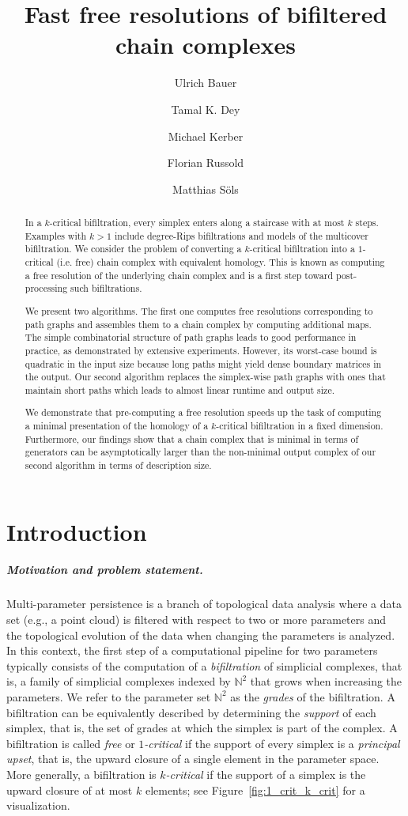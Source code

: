 \documentclass[a4paper,UKenglish,cleveref,nolineno,autoref]{socg-lipics-v2021}
\title{Fast free resolutions of bifiltered chain complexes}
\author{Ulrich Bauer}{Department of Mathematics and MDSI and MCML, Technical University of Munich, Germany}{mail@ulrich-bauer.org}{orcid.org/0000-0002-9683-0724}{}
\author{Tamal K. Dey}{Department of Computer Science, Purdue University, USA}{tamaldey@purdue.edu}{https://orcid.org/0000-0001-5160-9738}{NSF grants
DMS-2301360 and CCF-2437030}
\author{Michael Kerber}{Institute of Geometry, Graz University of Technology, Austria}{kerber@tugraz.at}{https://orcid.org/0000-0002-8030-9299}{Austrian Science Fund (FWF) grant 10.55776/P33765}
\author{Florian Russold}{Institute of Geometry, Graz University of Technology, Austria}{russold@tugraz.at}{https://orcid.org/0009-0003-2978-0477}{Austrian Science Fund (FWF) grants 10.55776/P33765 and 10.55776/W1230}
\author{Matthias S\"ols}{Department of Mathematics, Technical University of Munich, Germany and Institute of Geometry, Graz University of Technology, Austria}{matthias.soels@tum.de}{Add orcid number}{Austrian Science Fund (FWF) grants 10.55776/P33765 and 10.55776/W1230}
\newcommand{\define}[1]{\emph{#1}} %
\begin{document}
\maketitle

\begin{abstract}
In a $k$-critical bifiltration, every simplex enters along a staircase with at most $k$ steps. Examples with $k>1$ include degree-Rips bifiltrations and models of the multicover bifiltration. We consider the problem of converting a $k$-critical bifiltration into a $1$-critical (i.e. free) chain complex with equivalent homology. This is known as computing a free resolution of the underlying chain complex and is a first step toward post-processing such bifiltrations.

We present two algorithms. The first one computes free resolutions corresponding to path graphs and assembles them to a chain complex by computing additional maps. The simple combinatorial structure of path graphs leads to good performance in practice, as demonstrated by extensive experiments. However, its worst-case bound is quadratic in the input size because long paths might yield dense boundary matrices in the output. Our second algorithm replaces the simplex-wise path graphs with ones that maintain short paths which leads to almost linear runtime and output size.

We demonstrate that pre-computing a free resolution speeds up the task of computing a minimal presentation of the homology of a $k$-critical bifiltration in a fixed dimension. Furthermore, our findings show that a chain complex that is minimal in terms of generators can be asymptotically larger than the non-minimal output complex of our second algorithm in terms of description size.
\end{abstract}


\section{Introduction}
%
\subparagraph{Motivation and problem statement.}
%
Multi-parameter persistence is a branch of topological data analysis
where a data set (e.g., a point cloud) is filtered with respect to two or more parameters
and the topological evolution of the data when changing the parameters is analyzed.
In this context,
the first step of a computational pipeline for two parameters typically consists of the computation of a
\define{bifiltration} of simplicial complexes, that is, a family of simplicial complexes indexed by $\mathbb N^2$
that grows when increasing the parameters.
We refer to the parameter set $\mathbb N^2$ as the \define{grades} of the bifiltration.
A bifiltration can be equivalently described by
determining the \define{support} of each simplex, that is, the set of grades at which the
simplex is part of the complex.
A bifiltration is called \define{free} or
\define{$1$-critical} if the support
of every simplex is a \define{principal upset}, that is, the upward closure of a single element in the parameter space.
More generally, a bifiltration is \define{$k$-critical} if the support of a simplex
is the upward closure of at most $k$ elements; see Figure~\ref{fig:1_crit_k_crit} for a visualization.
\end{document}
